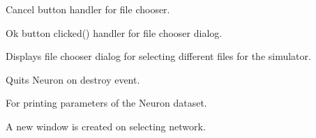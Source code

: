 \documentclass[letterpaper,10pt,english]{sphinxmanual}
\begin{document}
\begin{fulllineitems}

\begin{fulllineitems}
\label{index:neuron.neuron.on_fc_cancel}
Cancel button handler for file chooser.

\end{fulllineitems}



\begin{fulllineitems}
\label{index:neuron.neuron.on_fc_ok}
Ok button clicked() handler for file chooser dialog.

\end{fulllineitems}



\begin{fulllineitems}
\label{index:neuron.neuron.on_load}
Displays file chooser dialog for selecting different 
files for the simulator.

\end{fulllineitems}



\begin{fulllineitems}
\label{index:neuron.neuron.on_mainwindow_destroy}
Quits Neuron on destroy event.

\end{fulllineitems}



\begin{fulllineitems}
\label{index:neuron.neuron.on_print}
For printing parameters of the Neuron dataset.

\end{fulllineitems}



\begin{fulllineitems}
\label{index:neuron.neuron.on_selectnetwork}
A new window is created on selecting network.


\end{fulllineitems}
\end{fulllineitems}
\end{document}
